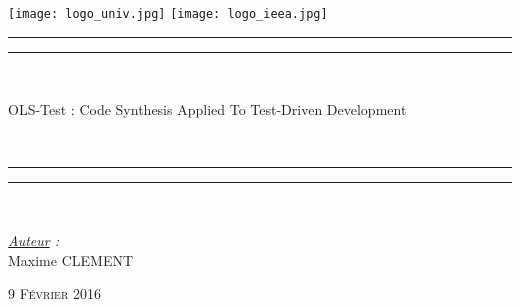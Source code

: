 \thispagestyle{cover}

\texttt{[image: logo\_univ.jpg]}
 \hfill \texttt{[image: logo\_ieea.jpg]} \\

\vspace*{10mm}

\begin{center}

	\vspace*{10mm}


	\rule[0.5ex]{\linewidth}{2pt}\vspace*{-\baselineskip}\vspace*{3.2pt}




	\rule[0.5ex]{\linewidth}{1pt}\\[\baselineskip]

		\begin{Huge}OLS-Test : Code Synthesis Applied To Test-Driven Development\end{Huge}\\[2mm]

	\rule[0.5ex]{\linewidth}{1pt}\vspace*{-\baselineskip}\vspace{3.2pt}
	\rule[0.5ex]{\linewidth}{2pt}\\

	\vspace*{20mm}

	{\LARGE \textit{\underline{Auteur} :}}\\
	\vspace*{3mm}
	{\LARGE Maxime CLEMENT}\\
	
	\vspace*{20mm}
	
	{\LARGE\textsc{9 Février 2016}}
	
\end{center}